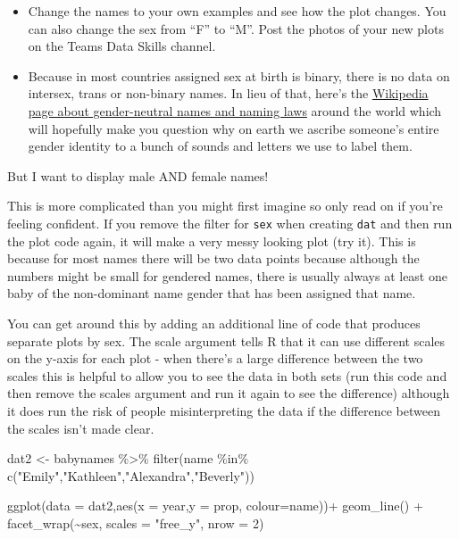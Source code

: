 \documentclass[
  oneside]{book}
\newenvironment{Shaded}{\begin{snugshade}}{\end{snugshade}}
\newcommand{\AttributeTok}[1]{\textcolor[rgb]{0.77,0.63,0.00}{#1}}
\newcommand{\DecValTok}[1]{\textcolor[rgb]{0.00,0.00,0.81}{#1}}
\newcommand{\FunctionTok}[1]{\textcolor[rgb]{0.00,0.00,0.00}{#1}}
\newcommand{\NormalTok}[1]{#1}
\newcommand{\OtherTok}[1]{\textcolor[rgb]{0.56,0.35,0.01}{#1}}
\newcommand{\SpecialCharTok}[1]{\textcolor[rgb]{0.00,0.00,0.00}{#1}}
\newcommand{\StringTok}[1]{\textcolor[rgb]{0.31,0.60,0.02}{#1}}
\providecommand{\tightlist}{%
  \setlength{\itemsep}{0pt}\setlength{\parskip}{0pt}}
\begin{document}
\begin{itemize}
\tightlist
\item
  Change the names to your own examples and see how the plot changes. You can also change the sex from ``F'' to ``M''. Post the photos of your new plots on the Teams Data Skills channel.
\item
  Because in most countries assigned sex at birth is binary, there is no data on intersex, trans or non-binary names. In lieu of that, here's the \href{https://en.wikipedia.org/wiki/Unisex_name}{Wikipedia page about gender-neutral names and naming laws} around the world which will hopefully make you question why on earth we ascribe someone's entire gender identity to a bunch of sounds and letters we use to label them.
\end{itemize}

But I want to display male AND female names!

This is more complicated than you might first imagine so only read on if you're feeling confident. If you remove the filter for \texttt{sex} when creating \texttt{dat} and then run the plot code again, it will make a very messy looking plot (try it). This is because for most names there will be two data points because although the numbers might be small for gendered names, there is usually always at least one baby of the non-dominant name gender that has been assigned that name.

You can get around this by adding an additional line of code that produces separate plots by sex. The scale argument tells R that it can use different scales on the y-axis for each plot - when there's a large difference between the two scales this is helpful to allow you to see the data in both sets (run this code and then remove the scales argument and run it again to see the difference) although it does run the risk of people misinterpreting the data if the difference between the scales isn't made clear.

\begin{Shaded}
\begin{Highlighting}[]
\NormalTok{dat2 }\OtherTok{\textless{}{-}}\NormalTok{ babynames }\SpecialCharTok{\%\textgreater{}\%} 
  \FunctionTok{filter}\NormalTok{(name }\SpecialCharTok{\%in\%} \FunctionTok{c}\NormalTok{(}\StringTok{"Emily"}\NormalTok{,}\StringTok{"Kathleen"}\NormalTok{,}\StringTok{"Alexandra"}\NormalTok{,}\StringTok{"Beverly"}\NormalTok{))}

\FunctionTok{ggplot}\NormalTok{(}\AttributeTok{data =}\NormalTok{ dat2,}\FunctionTok{aes}\NormalTok{(}\AttributeTok{x =}\NormalTok{ year,}\AttributeTok{y =}\NormalTok{ prop, }\AttributeTok{colour=}\NormalTok{name))}\SpecialCharTok{+}
  \FunctionTok{geom\_line}\NormalTok{() }\SpecialCharTok{+}
  \FunctionTok{facet\_wrap}\NormalTok{(}\SpecialCharTok{\textasciitilde{}}\NormalTok{sex, }\AttributeTok{scales =} \StringTok{"free\_y"}\NormalTok{, }\AttributeTok{nrow =} \DecValTok{2}\NormalTok{)}
\end{Highlighting}
\end{Shaded}
\end{document}
